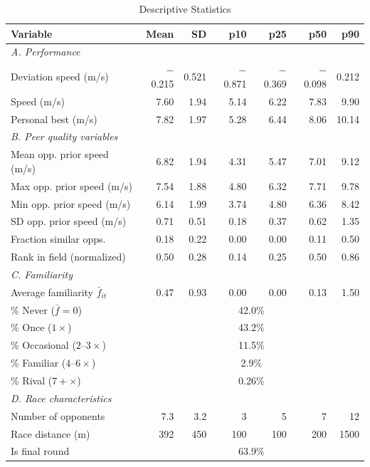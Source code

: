 \documentclass[12pt]{article}
\theoremstyle{definition}
\theoremstyle{remark}
\begin{document}
\begin{table}[H]
\centering
\begin{threeparttable}
\caption{Descriptive Statistics}
\label{tab:summary}
\renewcommand{\arraystretch}{1.15}
\begin{tabular}{lrrrrrr}
\toprule
Variable & Mean & SD & p10 & p25 & p50 & p90 \\
\midrule
\multicolumn{7}{l}{\textit{A. Performance}} \\
Deviation speed (m/s) & $-$0.215 & 0.521 & $-$0.871 & $-$0.369 & $-$0.098 & 0.212 \\
Speed (m/s) & 7.60 & 1.94 & 5.14 & 6.22 & 7.83 & 9.90 \\
Personal best (m/s) & 7.82 & 1.97 & 5.28 & 6.44 & 8.06 & 10.14 \\
\midrule
\multicolumn{7}{l}{\textit{B. Peer quality variables}} \\
Mean opp. prior speed (m/s) & 6.82 & 1.94 & 4.31 & 5.47 & 7.01 & 9.12 \\
Max opp. prior speed (m/s) & 7.54 & 1.88 & 4.80 & 6.32 & 7.71 & 9.78 \\
Min opp. prior speed (m/s) & 6.14 & 1.99 & 3.74 & 4.80 & 6.36 & 8.42 \\
SD opp. prior speed (m/s) & 0.71 & 0.51 & 0.18 & 0.37 & 0.62 & 1.35 \\
Fraction similar opps. & 0.18 & 0.22 & 0.00 & 0.00 & 0.11 & 0.50 \\
Rank in field (normalized) & 0.50 & 0.28 & 0.14 & 0.25 & 0.50 & 0.86 \\
\midrule
\multicolumn{7}{l}{\textit{C. Familiarity}} \\
Average familiarity $\bar{f}_{it}$ & 0.47 & 0.93 & 0.00 & 0.00 & 0.13 & 1.50 \\
\% Never ($\bar{f}=0$) & \multicolumn{6}{c}{42.0\%} \\
\% Once ($1\times$) & \multicolumn{6}{c}{43.2\%} \\
\% Occasional ($2$--$3\times$) & \multicolumn{6}{c}{11.5\%} \\
\% Familiar ($4$--$6\times$) & \multicolumn{6}{c}{2.9\%} \\
\% Rival ($7+\times$) & \multicolumn{6}{c}{0.26\%} \\
\midrule
\multicolumn{7}{l}{\textit{D. Race characteristics}} \\
Number of opponents & 7.3 & 3.2 & 3 & 5 & 7 & 12 \\
Race distance (m) & 392 & 450 & 100 & 100 & 200 & 1500 \\
Is final round & \multicolumn{6}{c}{63.9\%} \\

\end{tabular}
\end{threeparttable}
\end{table}
\end{document}
